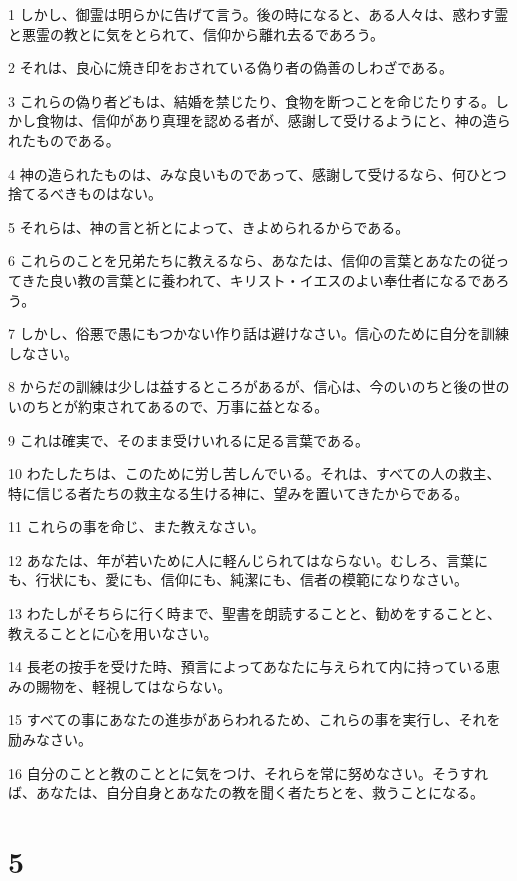 \par 1 しかし、御霊は明らかに告げて言う。後の時になると、ある人々は、惑わす霊と悪霊の教とに気をとられて、信仰から離れ去るであろう。
\par 2 それは、良心に焼き印をおされている偽り者の偽善のしわざである。
\par 3 これらの偽り者どもは、結婚を禁じたり、食物を断つことを命じたりする。しかし食物は、信仰があり真理を認める者が、感謝して受けるようにと、神の造られたものである。
\par 4 神の造られたものは、みな良いものであって、感謝して受けるなら、何ひとつ捨てるべきものはない。
\par 5 それらは、神の言と祈とによって、きよめられるからである。
\par 6 これらのことを兄弟たちに教えるなら、あなたは、信仰の言葉とあなたの従ってきた良い教の言葉とに養われて、キリスト・イエスのよい奉仕者になるであろう。
\par 7 しかし、俗悪で愚にもつかない作り話は避けなさい。信心のために自分を訓練しなさい。
\par 8 からだの訓練は少しは益するところがあるが、信心は、今のいのちと後の世のいのちとが約束されてあるので、万事に益となる。
\par 9 これは確実で、そのまま受けいれるに足る言葉である。
\par 10 わたしたちは、このために労し苦しんでいる。それは、すべての人の救主、特に信じる者たちの救主なる生ける神に、望みを置いてきたからである。
\par 11 これらの事を命じ、また教えなさい。
\par 12 あなたは、年が若いために人に軽んじられてはならない。むしろ、言葉にも、行状にも、愛にも、信仰にも、純潔にも、信者の模範になりなさい。
\par 13 わたしがそちらに行く時まで、聖書を朗読することと、勧めをすることと、教えることとに心を用いなさい。
\par 14 長老の按手を受けた時、預言によってあなたに与えられて内に持っている恵みの賜物を、軽視してはならない。
\par 15 すべての事にあなたの進歩があらわれるため、これらの事を実行し、それを励みなさい。
\par 16 自分のことと教のこととに気をつけ、それらを常に努めなさい。そうすれば、あなたは、自分自身とあなたの教を聞く者たちとを、救うことになる。

\chapter{5}

